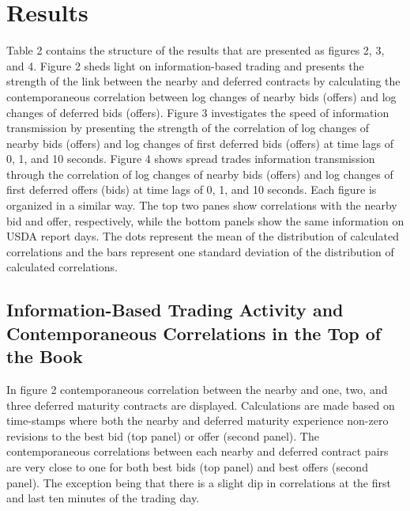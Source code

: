 \documentclass[review,12pt]{elsarticle}
\begin{document}
\section{Results}\label{results}

Table 2 contains the structure of the results that are presented as
figures 2, 3, and 4. Figure 2 sheds light on information-based trading
and presents the strength of the link between the nearby and deferred
contracts by calculating the contemporaneous correlation between log
changes of nearby bids (offers) and log changes of deferred bids
(offers). Figure 3 investigates the speed of information transmission by
presenting the strength of the correlation of log changes of nearby bids
(offers) and log changes of first deferred bids (offers) at time lags of
0, 1, and 10 seconds. Figure 4 shows spread trades information
transmission through the correlation of log changes of nearby bids
(offers) and log changes of first deferred offers (bids) at time lags of
0, 1, and 10 seconds. Each figure is organized in a similar way. The top
two panes show correlations with the nearby bid and offer, respectively,
while the bottom panels show the same information on USDA report days.
The dots represent the mean of the distribution of calculated
correlations and the bars represent one standard deviation of the
distribution of calculated correlations.

\subsection{Information-Based Trading Activity and Contemporaneous
Correlations in the Top of the
Book}\label{information-based-trading-activity-and-contemporaneous-correlations-in-the-top-of-the-book-1}

In figure 2 contemporaneous correlation between the nearby and one, two,
and three deferred maturity contracts are displayed. Calculations are
made based on time-stamps where both the nearby and deferred maturity
experience non-zero revisions to the best bid (top panel) or offer
(second panel). The contemporaneous correlations between each nearby and
deferred contract pairs are very close to one for both best bids (top
panel) and best offers (second panel). The exception being that there is
a slight dip in correlations at the first and last ten minutes of the
trading day.
\end{document}
